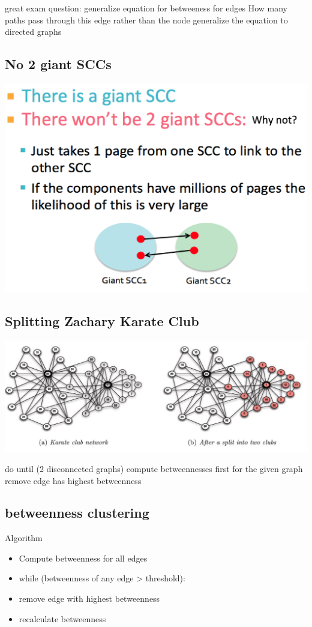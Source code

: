 \documentclass[11pt]{article}
\theoremstyle{definition}
\begin{document}
great exam question: generalize equation for betweeness for edges
How many paths pass through this edge rather than the node
generalize the equation to directed graphs

\subsection{No 2 giant SCCs}
\includegraphics[width=\textwidth/4]{28.png}


\subsection{Splitting Zachary Karate Club}
\includegraphics[width=\textwidth/2]{22.png}

do until (2 disconnected graphs)
compute betweennesses first for the given graph
remove edge has highest betweenness

\subsection{betweenness clustering}
Algorithm

\begin{itemize}
    \item Compute betweenness for all edges
    \item while (betweenness of any edge > threshold):
    \item remove edge with highest betweenness
    \item recalculate betweenness
\end{itemize}
\end{document}
